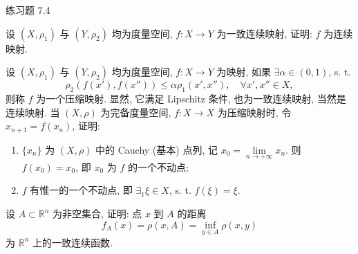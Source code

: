 \begin{exblock}{练习题 7.4}
  \item 设 $(X, \rho_{1})$ 与 $(Y, \rho_{2})$ 均为度量空间, $f\colon X \to Y$ 为一致连续映射, 证明: $f$ 为连续映射.

  \item 设 $(X, \rho_{1})$ 与 $(Y, \rho_{2})$ 均为度量空间, $f\colon X \to Y$ 为映射, 如果 $\exists \alpha \in (0, 1)$, s. t.
  \[
    \rho_{2}(f(x'), f(x'')) \leqslant \alpha \rho_{1}(x', x''),\quad \forall x', x'' \in X,
  \]
  则称 $f$ 为一个压缩映射. 显然, 它满足 Lipschitz 条件, 也为一致连续映射, 当然是连续映射. 当 $(X, \rho)$ 为完备度量空间, $f\colon X \to X$ 为压缩映射时, 令 $x_{n+1} = f(x_{n})$, 证明:
  \begin{enumerate}
    \item $\{x_{n}\}$ 为 $(X, \rho)$ 中的 Cauchy (基本) 点列, 记 $x_{0} = \lim\limits_{n \to +\infty} x_{n}$. 则 $f(x_{0}) = x_{0}$, 即 $x_{0}$ 为 $f$ 的一个不动点;
    \item $f$ 有惟一的一个不动点, 即 $\exists_{1}\xi \in X$, s. t. $f(\xi) = \xi$.
  \end{enumerate}

  \item 设 $A \subset \mathbb{R}^{n}$ 为非空集合, 证明: 点 $x$ 到 $A$ 的距离
  \[
    f_{A}(x) = \rho(x, A) = \inf_{y \in A} \rho(x, y)
  \]
  为 $\mathbb{R}^{n}$ 上的一致连续函数.
\end{exblock}

